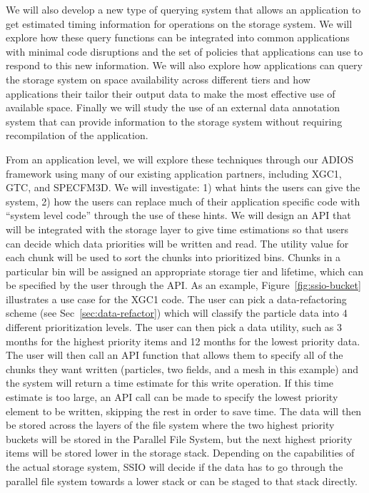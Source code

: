 We will also develop a new type of querying system that allows an application
to get estimated timing information for operations on the storage system.
We will explore
how these query functions can be integrated into common applications with
minimal code disruptions and the set of policies that applications can use to
respond to this new information. We will also explore how applications can
query the storage system on space availability across different tiers and how
applications their tailor their output data to make the most effective use of
available space.
Finally we will study the use of an external data annotation system that can
provide information to the storage system without requiring recompilation of the application.

%
From an application level, we will explore these techniques through our ADIOS
framework using many of our existing application partners, including
XGC1, GTC, and SPECFM3D. We will investigate: 1) what hints the users can give
the system, 2) how the users can replace much of their
application specific code with
``system level code'' through the use of these hints.  We will design an API
that will be integrated with the storage layer to give time estimations so that
users can decide which data priorities will be written and read. The utility
value for each chunk will be used to sort the chunks into prioritized bins.
Chunks in a particular bin will be assigned an appropriate storage
tier and lifetime, which can be specified by the user through the API.
As an example, Figure~\ref{fig:ssio-bucket} illustrates a use case for the XGC1 code.
The user can pick a data-refactoring scheme (see
Sec~\ref{sec:data-refactor}) which will classify the particle data into 4 different
prioritization levels. The user can then pick a data utility, such as 3 months
for the highest priority items and 12 months for the lowest priority data.
The user will then call an API function that allows them
to specify all of the chunks they want
written (particles, two fields, and a mesh in this example) and the system
will return a time estimate for this write operation.
If this time estimate is too large, an API call can be made to 
specify the lowest priority element to be written, skipping the rest in order to save time.
The data will then be stored
across the layers of the file system where the two highest priority buckets
will be stored in the Parallel File System, but the next highest priority items
will be stored lower in the storage stack. Depending on the capabilities of the actual storage system, 
SSIO will decide if the data has to go through the parallel file system 
towards a lower stack or can be staged to that stack directly. 
%


